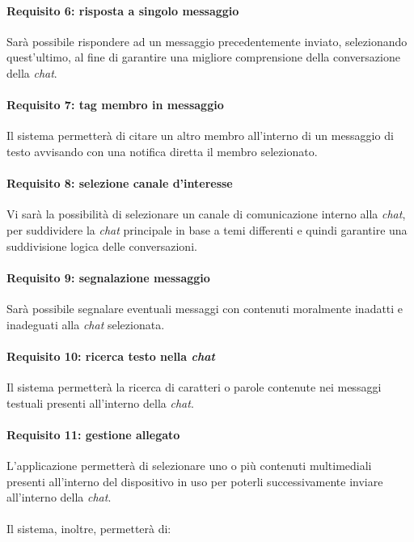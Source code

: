 \paragraph{Requisito 6: risposta a singolo messaggio\\}
Sarà possibile rispondere ad un messaggio precedentemente inviato, selezionando quest’ultimo, al fine di garantire una migliore comprensione della conversazione della \emph{chat}.

\paragraph{Requisito 7: tag membro in messaggio\\}
Il sistema permetterà di citare un altro membro all’interno di un messaggio di testo avvisando con una notifica diretta il membro selezionato.

\paragraph{Requisito 8: selezione canale d'interesse\\}
Vi sarà la possibilità di selezionare un canale di comunicazione interno alla \emph{chat}, per suddividere la \emph{chat} principale in base a temi differenti e quindi garantire una suddivisione logica delle conversazioni.

\paragraph{Requisito 9: segnalazione messaggio\\}
Sarà possibile segnalare eventuali messaggi con contenuti moralmente inadatti e inadeguati alla \emph{chat} selezionata.

\paragraph{Requisito 10: ricerca testo nella \emph{chat}\\}
Il sistema permetterà la ricerca di caratteri o parole contenute nei messaggi testuali presenti all’interno della \emph{chat}.

\paragraph{Requisito 11: gestione allegato\\}
L’applicazione permetterà di selezionare uno o più contenuti multimediali presenti all’interno del dispositivo in uso per poterli successivamente inviare all’interno della \emph{chat}.\\
\\
Il sistema, inoltre, permetterà di:

